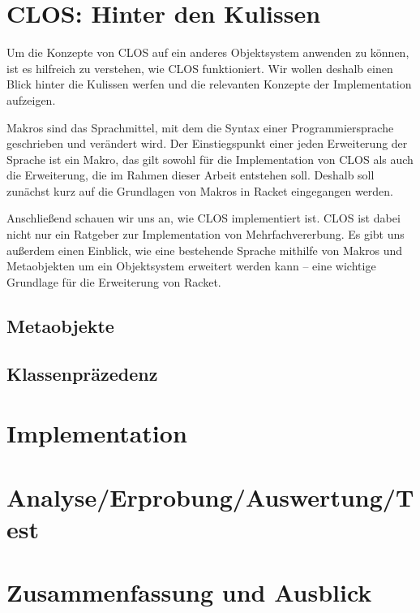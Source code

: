 
\pagestyle{diplHeadings}





\setcounter{page}{1}
\tableofcontents
\cleardoublepage 

\setcounter{page}{1} 
\mainmatter  
{}

 

 



\chapter{CLOS: Hinter den Kulissen}
Um die Konzepte von CLOS auf ein anderes Objektsystem anwenden zu können, ist es hilfreich zu verstehen, wie CLOS funktioniert. Wir wollen deshalb einen Blick hinter die Kulissen werfen und die relevanten Konzepte der Implementation aufzeigen.

Makros sind das Sprachmittel, mit dem die Syntax einer Programmiersprache geschrieben und verändert wird. Der Einstiegspunkt einer jeden Erweiterung der Sprache ist ein Makro, das gilt sowohl für die Implementation von CLOS als auch die Erweiterung, die im Rahmen dieser Arbeit entstehen soll. Deshalb soll zunächst kurz auf die Grundlagen von Makros in Racket eingegangen werden.

Anschließend schauen wir uns an, wie CLOS implementiert ist. CLOS ist dabei nicht nur ein Ratgeber zur Implementation von Mehrfachvererbung. Es gibt uns außerdem einen Einblick, wie eine bestehende Sprache mithilfe von Makros und Metaobjekten um ein Objektsystem erweitert werden kann -- eine wichtige Grundlage für die Erweiterung von Racket.



\section{Metaobjekte}

\section{Klassenpräzedenz}

\chapter{Implementation}  %

\chapter{Analyse/Erprobung/Auswertung/Test}

\chapter{Zusammenfassung und Ausblick}



 



